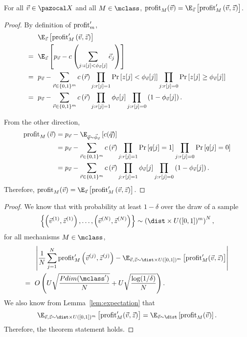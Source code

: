 \begin{lemma}\label{lem:expectation}
For all $\vec{v} \in \domain$ and all $M \in \mclass$, $\profit_M(\vec{v}) = \E_{\vec{z}}\left[\profit_{M} '\left(\vec{v}, \vec{z}\right)\right]$.
\end{lemma}

\begin{proof} By definition of $\textnormal{profit}_m'$,
\begin{align*}
&\E_{\vec{z}}\left[\profit_{M} '\left(\vec{v}, \vec{z}\right)\right]\\
=\text{ }&\E_{\vec{z}}\left[p_{\vec{v}} - c\left(\sum_{j: z[j] < \phi_{\vec{v}}[j]} \vec{e}_j\right)\right]\\
=\text{ }& p_{\vec{v}} - \sum_{\vec{r} \in \{0,1\}^m}c\left(\vec{r}\right)\prod_{j: r[j] = 1}\Pr\left[z[j] < \phi_{\vec{v}}[j] \right]\prod_{j: r[j] = 0}\Pr\left[z[j] \geq \phi_{\vec{v}}[j] \right]\\
=\text{ }& p_{\vec{v}} - \sum_{\vec{r} \in \{0,1\}^m}c\left(\vec{r}\right)\prod_{j: r[j] = 1}\phi_{\vec{v}}[j]\prod_{j: r[j] = 0}\left(1-\phi_{\vec{v}}[j]\right).
\end{align*}

From the other direction, \begin{align*}
\profit_{M} \left(\vec{v}\right) &= p_{\vec{v}} - \E_{\vec{q} \sim \vec{\phi}_{\vec{v}}}\left[c(\vec{q})\right]\\
&= p_{\vec{v}} - \sum_{\vec{r} \in \{0,1\}^m}c\left(\vec{r}\right)\prod_{j: r[j] = 1}\Pr\left[q[j] = 1 \right]\prod_{j: r[j] = 0}\Pr\left[q[j] = 0 \right]\\
&= p_{\vec{v}} - \sum_{\vec{r} \in \{0,1\}^m}c\left(\vec{r}\right)\prod_{j: r[j] = 1}\phi_{\vec{v}}[j]\prod_{j: r[j] = 0}\left(1-\phi_{\vec{v}}[j]\right).
\end{align*} Therefore, $\profit_M(\vec{v}) = \E_{\vec{z}}\left[\profit_{M} '\left(\vec{v}, \vec{z}\right)\right]$.
\end{proof}

\lotteryEquiv*

\begin{proof}
We know that with probability at least $1-\delta$ over the draw of a sample \[\left\{\left(\vec{v}^{(1)}, \vec{z}^{(1)}\right), \dots, \left(\vec{v}^{(N)}, \vec{z}^{(N)}\right)\right\} \sim \left(\dist \times U([0,1])^{m}\right)^N,\] for all mechanisms $M \in \mclass$, \begin{align*}&\left|\frac{1}{N} \sum_{j = 1}^N \profit_{M} '\left(\vec{v}^{(j)}, \vec{z}^{(j)}\right) - \E_{\vec{v}, \vec{z} \sim \dist \times U([0,1])^{m}}\left[\profit_M'(\vec{v}, \vec{z})\right] \right|\\
= \text{ }&O\left(U \sqrt{\frac{Pdim(\mclass')}{N}} + U \sqrt{\frac{\log(1/\delta)}{N}}\right).\end{align*} We also know from Lemma~\ref{lem:expectation} that \[\E_{\vec{v}, \vec{z} \sim \dist \times U([0,1])^{m}}\left[\profit_M'(\vec{v}, \vec{z})\right] = \E_{\vec{v} \sim \dist}\left[\profit_M(\vec{v})\right].\] Therefore, the theorem statement holds.
\end{proof}

